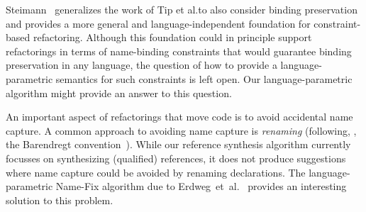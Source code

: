 Steimann~\cite{Steimann18} generalizes the work of Tip et al.\@ to also consider binding preservation and provides a more general and language-independent foundation for constraint-based refactoring.
Although this foundation could in principle support refactorings in terms of name-binding constraints that would guarantee binding preservation in any language, the question of how to provide a language-parametric semantics for such constraints is left open.
Our language-parametric algorithm might provide an answer to this question.

An important aspect of refactorings that move code is to avoid accidental name capture.
A common approach to avoiding name capture is \emph{renaming} (following, \eg, the Barendregt convention~\cite{0067558}).
While our reference synthesis algorithm currently focusses on synthesizing (qualified) references, it does not produce suggestions where name capture could be avoided by renaming declarations.
The language-parametric Name-Fix algorithm due to Erdweg~et~al.~\cite{ErdwegSD14} provides an interesting solution to this problem.



